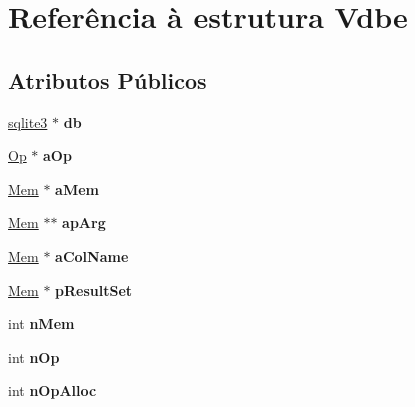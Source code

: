 \hypertarget{struct_vdbe}{\section{Referência à estrutura Vdbe}
\label{struct_vdbe}
}
\subsection*{Atributos Públicos}
\begin{DoxyCompactItemize}
\item 
\hypertarget{struct_vdbe_a495366101a593999f4d2ed905e839029}{\hyperlink{structsqlite3}{sqlite3} $\ast$ {\bfseries db}}\label{struct_vdbe_a495366101a593999f4d2ed905e839029}

\item 
\hypertarget{struct_vdbe_a1ba82f08947b275dd72a3e3095ad02d5}{\hyperlink{struct_vdbe_op}{Op} $\ast$ {\bfseries a\-Op}}\label{struct_vdbe_a1ba82f08947b275dd72a3e3095ad02d5}

\item 
\hypertarget{struct_vdbe_ac36776c53b6ec9054a2826ec83f29953}{\hyperlink{struct_mem}{Mem} $\ast$ {\bfseries a\-Mem}}\label{struct_vdbe_ac36776c53b6ec9054a2826ec83f29953}

\item 
\hypertarget{struct_vdbe_a74fd4612c55ac2fde475096a4d2605b5}{\hyperlink{struct_mem}{Mem} $\ast$$\ast$ {\bfseries ap\-Arg}}\label{struct_vdbe_a74fd4612c55ac2fde475096a4d2605b5}

\item 
\hypertarget{struct_vdbe_a900f557143e7d2ab8c560f7ada66d0f7}{\hyperlink{struct_mem}{Mem} $\ast$ {\bfseries a\-Col\-Name}}\label{struct_vdbe_a900f557143e7d2ab8c560f7ada66d0f7}

\item 
\hypertarget{struct_vdbe_a0dec47b8d8c481df2b73d5bbf9cdde11}{\hyperlink{struct_mem}{Mem} $\ast$ {\bfseries p\-Result\-Set}}\label{struct_vdbe_a0dec47b8d8c481df2b73d5bbf9cdde11}

\item 
\hypertarget{struct_vdbe_a10a19309607617a75d3722219d3c7615}{int {\bfseries n\-Mem}}\label{struct_vdbe_a10a19309607617a75d3722219d3c7615}

\item 
\hypertarget{struct_vdbe_a81e72e6812c71e13651f81cc3a6ca1d0}{int {\bfseries n\-Op}}\label{struct_vdbe_a81e72e6812c71e13651f81cc3a6ca1d0}

\item 
\hypertarget{struct_vdbe_aa52020050ea42e10ad8be8ebdf470850}{int {\bfseries n\-Op\-Alloc}}\label{struct_vdbe_aa52020050ea42e10ad8be8ebdf470850}


\end{DoxyCompactItemize}
